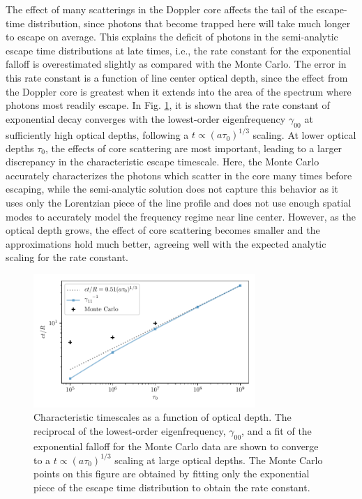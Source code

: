 \documentclass{aastex63}
\begin{document}
The effect of many scatterings in the Doppler core affects the tail of the escape-time distribution, since photons that become trapped here will take much longer to escape on average. This explains the deficit of photons in the semi-analytic escape time distributions at late times, i.e., the rate constant for the exponential falloff is overestimated slightly as compared with the Monte Carlo. The error in this rate constant is a function of line center optical depth, since the effect from the Doppler core is greatest when it extends into the area of the spectrum where photons most readily escape. In Fig. \ref{fig:tau_scaling}, it is shown that the rate constant of exponential decay converges with the lowest-order eigenfrequency $\gamma_{00}$ at sufficiently high optical depths, following a $t\propto(a\tau_0)^{1/3}$ scaling. At lower optical depths $\tau_0$, the effects of core scattering are most important, leading to a larger discrepancy in the characteristic escape timescale. Here, the Monte Carlo accurately characterizes the photons which scatter in the core many times before escaping, while the semi-analytic solution does not capture this behavior as it uses only the Lorentzian piece of the line profile and does not use enough spatial modes to accurately model the frequency regime near line center. However, as the optical depth grows, the effect of core scattering becomes smaller and the approximations hold much better, agreeing well with the expected analytic scaling for the rate constant.

\begin{figure}
    \centering
    \includegraphics[width=0.75\textwidth]{tau_scaling.pdf}
    \caption{Characteristic timescales as a function of optical depth. The reciprocal of the lowest-order eigenfrequency, $\gamma_{00}$, and a fit of the exponential falloff for the Monte Carlo data are shown to converge to a $t \propto (a\tau_0)^{1/3}$ scaling at large optical depths. The Monte Carlo points on this figure are obtained by fitting only the exponential piece of the escape time distribution to obtain the rate constant.}
    \label{fig:tau_scaling}
\end{figure}
\end{document}
